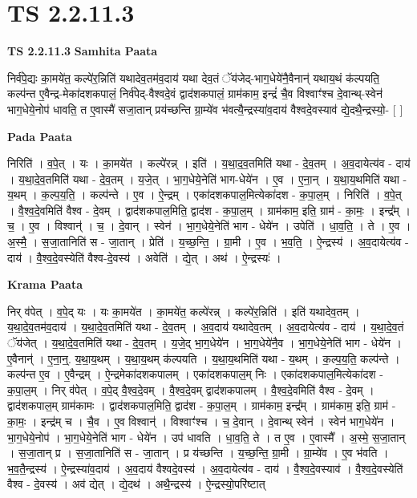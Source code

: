 \documentclass[17pt]{extarticle}
\begin{document}
\section{ TS 2.2.11.3 }

\textbf{TS 2.2.11.3 } \newline
\textbf{Samhita Paata} \newline

निर्व॑पे॒द्यः का॒मये॑त॒ कल्पे॑र॒न्निति॑ यथादेव॒तम॑व॒दाय॑ यथा देव॒तं ॅय॑जेद्-भाग॒धेये॑नै॒वैनान्॑ यथाय॒थं क॑ल्पयति॒ कल्प॑न्त ए॒वैन्द्र-मेका॑दशकपालं॒ निर्व॑पेद्-वैश्वदे॒वं द्वाद॑शकपालं॒ ग्राम॑काम॒ इन्द्रं॑ चै॒व विश्वाꣳ॑श्च दे॒वान्थ्-स्वेन॑ भाग॒धेये॒नोप॑ धावति॒ त ए॒वास्मै॑ सजा॒तान् प्रय॑च्छन्ति ग्रा॒म्ये॑व भ॑वत्यै॒न्द्रस्या॑व॒दाय॑ वैश्वदे॒वस्याव॑ द्ये॒दथै॒न्द्रस्यो॒- [  ] \newline

\textbf{Pada Paata} \newline

निरिति॑ । व॒पे॒त् । यः । का॒मये॑त । कल्पे॑रन्न् । इति॑ । य॒था॒द॒व॒तमिति॑ यथा - दे॒व॒तम् । अ॒व॒दायेत्य॑व - दाय॑ । य॒था॒दे॒व॒तमिति॑ यथा - दे॒व॒तम् । य॒जे॒त् । भा॒ग॒धेये॒नेति॑ भाग-धेये॑न । ए॒व । ए॒ना॒न् । य॒था॒य॒थमिति॑ यथा - य॒थम् । क॒ल्प॒य॒ति॒ । कल्प॑न्ते । ए॒व । ऐ॒न्द्रम् । एका॑दशकपाल॒मित्येका॑दश - क॒पा॒ल॒म् । निरिति॑ । व॒पे॒त् । वै॒श्व॒दे॒वमिति॑ वैश्व - दे॒वम् । द्वाद॑शकपाल॒मिति॒ द्वाद॑श - क॒पा॒ल॒म् । ग्राम॑काम॒ इति॒ ग्राम॑ - का॒मः॒ । इन्द्र᳚म् । च॒ । ए॒व । विश्वान्॑ । च॒ । दे॒वान् । स्वेन॑ । भा॒ग॒धेये॒नेति॑ भाग - धेये॑न । उपेति॑ । धा॒व॒ति॒ । ते । ए॒व । अ॒स्मै॒ । स॒जा॒तानिति॑ स - जा॒तान् । प्रेति॑ । य॒च्छ॒न्ति॒ । ग्रा॒मी । ए॒व । भ॒व॒ति॒ । ऐ॒न्द्रस्य॑ । अ॒व॒दायेत्य॑व - दाय॑ । वै॒श्व॒दे॒वस्येति॑ वैश्व-दे॒वस्य॑ । अवेति॑ । द्ये॒त् । अथ॑ । ऐ॒न्द्रस्यः॑ ।  \newline


\textbf{Krama Paata} \newline

निर् व॑पेत् । व॒पे॒द् यः । यः का॒मये॑त । का॒मये॑त॒ कल्पे॑रन्न् । कल्पे॑र॒न्निति॑ । इति॑ यथादेव॒तम् । य॒था॒दे॒व॒तम॑व॒दाय॑ । य॒था॒दे॒व॒तमिति॑ यथा - दे॒व॒तम् । अ॒व॒दाय॑ यथादेव॒तम् । अ॒व॒दायेत्य॑व - दाय॑ । य॒था॒दे॒व॒तं ॅय॑जेत् । य॒था॒दे॒व॒तमिति॑ यथा - दे॒व॒तम् । य॒जे॒द् भा॒ग॒धेये॑न । भा॒ग॒धेये॑नै॒व । भा॒ग॒धेये॒नेति॑ भाग - धेये॑न । ए॒वैनान्॑ । ए॒ना॒न्॒. य॒था॒य॒थम् । य॒था॒य॒थम् क॑ल्पयति । य॒था॒य॒थमिति॑ यथा - य॒थम् । क॒ल्प॒य॒ति॒ कल्प॑न्ते । कल्प॑न्त ए॒व । ए॒वैन्द्रम् । ऐ॒न्द्रमेका॑दशकपालम् । एका॑दशकपाल॒म् निः । एका॑दशकपाल॒मित्येका॑दश - क॒पा॒ल॒म् । निर् व॑पेत् । व॒पे॒द् वै॒श्व॒दे॒वम् । वै॒श्व॒दे॒वम् द्वाद॑शकपालम् । वै॒श्व॒दे॒वमिति॑ वैश्व - दे॒वम् । द्वाद॑शकपाल॒म् ग्राम॑कामः । द्वाद॑शकपाल॒मिति॒ द्वाद॑श - क॒पा॒ल॒म् । ग्राम॑काम॒ इन्द्र᳚म् । ग्राम॑काम॒ इति॒ ग्राम॑ - का॒मः॒ । इन्द्र॑म् च । चै॒व । ए॒व विश्वान्॑ । विश्वाꣳ॑श्च । च॒ दे॒वान् । दे॒वान्थ् स्वेन॑ । स्वेन॑ भाग॒धेये॑न । भा॒ग॒धेये॒नोप॑ । भा॒ग॒धेये॒नेति॑ भाग - धेये॑न । उप॑ धावति । धा॒व॒ति॒ ते । त ए॒व । ए॒वास्मै᳚ । अ॒स्मे॒ स॒जा॒तान् । स॒जा॒तान् प्र । स॒जा॒तानिति॑ स - जा॒तान् । प्र य॑च्छन्ति । य॒च्छ॒न्ति॒ ग्रा॒मी । ग्रा॒म्ये॑व । ए॒व भ॑वति । भ॒व॒तै॒न्द्रस्य॑ । ऐ॒न्द्रस्या॑व॒दाय॑ । अ॒व॒दाय॑ वैश्वदे॒वस्य॑ । अ॒व॒दायेत्य॑व - दाय॑ । वै॒श्व॒दे॒वस्याव॑ । वै॒श्व॒दे॒वस्येति॑ वैश्व - दे॒वस्य॑ । अव॑ द्येत् । द्ये॒दथ॑ । अथै॒न्द्रस्य॑ । ऐ॒न्द्रस्यो॒परि॑ष्टात् \newline
\end{document}
